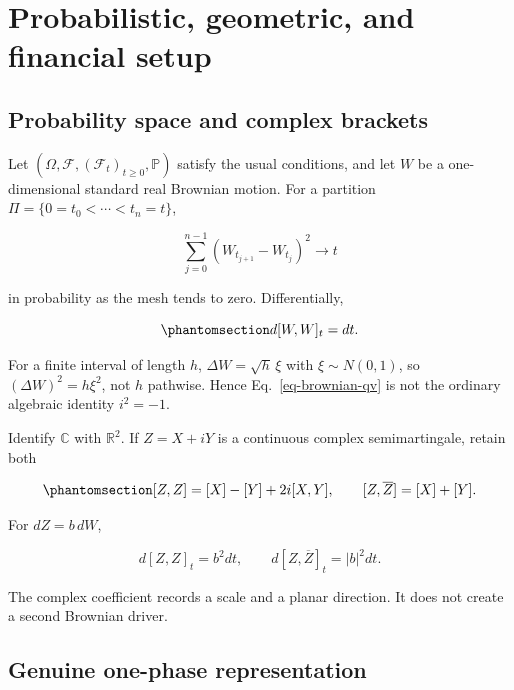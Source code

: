 \documentclass[
  english,
  10pt,
  letterpaper,
  DIV=11,
  numbers=noendperiod]{scrartcl}
\theoremstyle{definition}
\theoremstyle{plain}
\theoremstyle{plain}
\theoremstyle{remark}
\begin{document}
\section{Probabilistic, geometric, and financial setup}\label{sec-setup}

\subsection{Probability space and complex
brackets}\label{probability-space-and-complex-brackets}

Let \((\Omega,\mathcal F,(\mathcal F_t)_{t\ge0},\mathbb P)\) satisfy the
usual conditions, and let \(W\) be a one-dimensional standard real
Brownian motion. For a partition \(\Pi=\{0=t_0<\cdots<t_n=t\}\),

\[
\sum_{j=0}^{n-1}(W_{t_{j+1}}-W_{t_j})^2
\longrightarrow t
\]

in probability as the mesh tends to zero. Differentially,

\begin{equation}\protect\phantomsection\label{eq-brownian-qv}{
d[W,W]_t=dt.
}\end{equation}

For a finite interval of length \(h\), \(\Delta W=\sqrt h\,\xi\) with
\(\xi\sim N(0,1)\), so \((\Delta W)^2=h\xi^2\), not \(h\) pathwise.
Hence Eq.~\ref{eq-brownian-qv} is not the ordinary algebraic identity
\(i^2=-1\).

Identify \(\mathbb C\) with \(\mathbb R^2\). If \(Z=X+iY\) is a
continuous complex semimartingale, retain both

\begin{equation}\protect\phantomsection\label{eq-complex-brackets}{
[Z,Z]=[X]-[Y]+2i[X,Y],
\qquad
[Z,\overline Z]=[X]+[Y].
}\end{equation}

For \(dZ=b\,dW\),

\[
d[Z,Z]_t=b^2dt,\qquad
d[Z,\overline Z]_t=|b|^2dt.
\]

The complex coefficient records a scale and a planar direction. It does
not create a second Brownian driver.

\subsection{Genuine one-phase
representation}\label{genuine-one-phase-representation}
\end{document}
